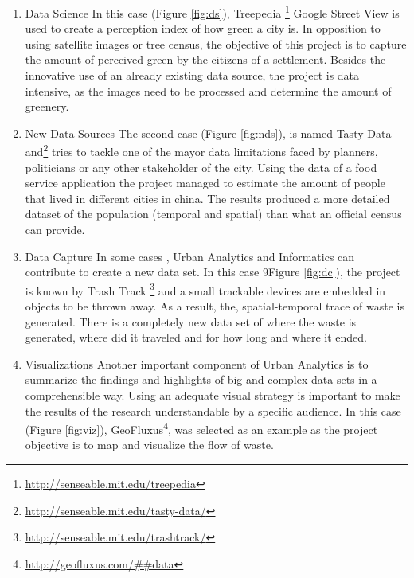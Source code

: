 \begin{enumerate}


    \item{Data Science}
In this case (Figure \ref{fig:ds}), Treepedia \footnote{\url{http://senseable.mit.edu/treepedia}} Google Street View is used to create a perception index of how green a city is. In opposition to using satellite images or tree census, the objective of this project is to capture the amount of perceived green by the citizens of a settlement. Besides the innovative use of an already existing data source, the project is data intensive, as the images need to be processed and determine the amount of greenery.



    \item{New Data Sources}
The second case (Figure \ref{fig:nds}), is named Tasty Data and\footnote{\url{http://senseable.mit.edu/tasty-data/}} tries to tackle one of the mayor data limitations faced by planners, politicians or any other stakeholder of the city. Using the data of a food service application the project managed to estimate the amount of people that lived in different cities in china. The results produced a more detailed dataset of the population (temporal and spatial) than what an official census can provide.


    \item{Data Capture}
In some cases , Urban Analytics and Informatics can contribute to create a new data set. In this case 9Figure \ref{fig:dc}), the project is known by Trash Track \footnote{\url{http://senseable.mit.edu/trashtrack/}} and a  small trackable devices are embedded in objects to be thrown away. As a result, the, spatial-temporal trace of waste is generated. There is a completely new data set of where the waste is generated, where did it traveled and for how long and where it ended. 




    \item {Visualizations}
Another important component of Urban Analytics is to summarize the findings and highlights of big and complex data sets in a comprehensible way. Using an adequate visual strategy is important to make the results of the research understandable by a specific audience. In this case (Figure \ref{fig:viz}), GeoFluxus\footnote{\url{http://geofluxus.com/##data}}, was selected as an example as the project objective is to map and visualize the flow of waste.


\end{enumerate}

